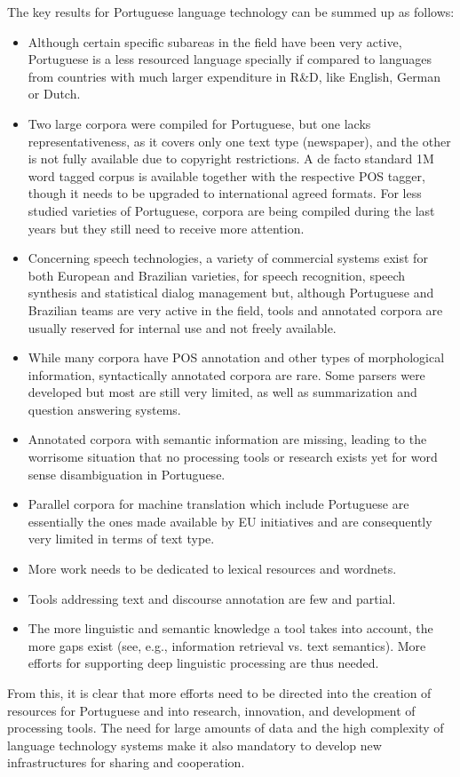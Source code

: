 \documentclass[]{../metanetpaper}
\begin{document}
\begin{multicols}{2}
The key results for Portuguese language technology can be summed up as follows:

\begin{itemize}
      \item Although certain specific subareas in the field have been very active, Portuguese is a less resourced language specially if compared to languages from countries with much larger expenditure in R\&D, like English, German or Dutch.
      \item Two large corpora were compiled for Portuguese, but one lacks representativeness, as it covers only one text type (newspaper), and the other is not fully available due to copyright restrictions. A de facto standard 1M word tagged corpus is available together with the respective POS tagger, though it needs to be upgraded to international agreed formats. For less studied varieties of Portuguese, corpora are being compiled during the last years but they still need to receive more attention.
     \item Concerning speech technologies, a variety of commercial systems exist for both European and Brazilian varieties, for speech recognition, speech synthesis and statistical dialog management but, although Portuguese and Brazilian teams are very active in the field, tools and annotated corpora are usually reserved for internal use and not freely available.
    \item While many corpora have POS annotation and other types of morphological information, syntactically annotated corpora are rare. Some parsers were developed but most are still very limited,  as well as summarization and question answering systems.
    \item Annotated corpora with semantic information are missing, leading to the worrisome situation that no processing tools or research exists yet for word sense disambiguation in Portuguese. 
    \item Parallel corpora for machine translation which include Portuguese are essentially the ones made available by EU initiatives and are consequently very limited in terms of text type.
   \item More work needs to be dedicated to lexical resources and wordnets.
   \item Tools addressing text and discourse annotation are few and partial.
   \item The more linguistic and semantic knowledge a tool takes into account, the more gaps exist (see, e.g., information retrieval vs. text semantics). More efforts for supporting deep linguistic processing are thus needed.
    \end{itemize}
   From this, it is clear that more efforts need to be directed into the creation of resources for Portuguese and into research, innovation, and development of processing tools. The need for large amounts of data and the high complexity of language technology systems make it also mandatory to develop new infrastructures for sharing and cooperation.


\end{multicols}
\end{document}
